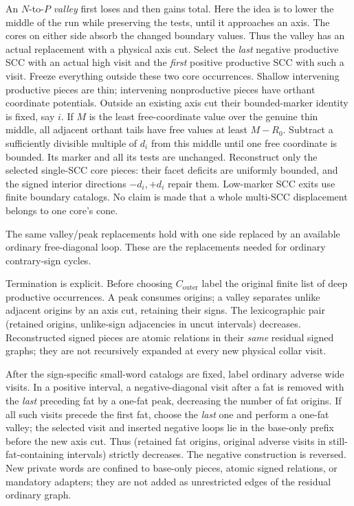 \documentclass[11pt,a4paper]{article}
\theoremstyle{remark}
\newcommand{\Co}{C_{\mathrm{outer}}}
\begin{document}
An \(N\)-to-\(P\) \emph{valley} first loses and then gains total.
Here the idea is to lower the middle of the run while preserving the
tests, until it approaches an axis. The cores on either side absorb
the changed boundary values. Thus the valley has an actual replacement
with a physical axis cut. Select the \emph{last} negative productive SCC with an actual high visit and the \emph{first} positive productive SCC with such a visit. Freeze everything outside these two core occurrences. Shallow intervening productive pieces are thin; intervening nonproductive pieces have orthant coordinate potentials. Outside an existing axis cut their bounded-marker identity is fixed, say \(i\). If \(M\) is the least free-coordinate value over the genuine thin middle, all adjacent orthant tails have free values at least \(M-R_0\). Subtract a sufficiently divisible multiple of \(d_i\) from this middle until one free coordinate is bounded. Its marker and all its tests are unchanged. Reconstruct only the selected single-SCC core pieces: their facet deficits are uniformly bounded, and the signed interior directions \(-d_i,+d_i\) repair them. Low-marker SCC exits use finite boundary catalogs. No claim is made that a whole multi-SCC displacement belongs to one core's cone.

The same valley/peak replacements hold with one side replaced by an available ordinary free-diagonal loop. These are the replacements needed for ordinary contrary-sign cycles.

Termination is explicit. Before choosing \(\Co\) label the original finite list of deep productive occurrences. A peak consumes origins; a valley separates unlike adjacent origins by an axis cut, retaining their signs. The lexicographic pair (retained origins, unlike-sign adjacencies in uncut intervals) decreases. Reconstructed signed pieces are atomic relations in their \emph{same} residual signed graphs; they are not recursively expanded at every new physical collar visit.

After the sign-specific small-word catalogs are fixed, label ordinary adverse wide visits. In a positive interval, a negative-diagonal visit after a fat is removed with the \emph{last} preceding fat by a one-fat peak, decreasing the number of fat origins. If all such visits precede the first fat, choose the \emph{last} one and perform a one-fat valley; the selected visit and inserted negative loops lie in the base-only prefix before the new axis cut. Thus (retained fat origins, original adverse visits in still-fat-containing intervals) strictly decreases. The negative construction is reversed. New private words are confined to base-only pieces, atomic signed relations, or mandatory adapters; they are not added as unrestricted edges of the residual ordinary graph.
\end{document}
